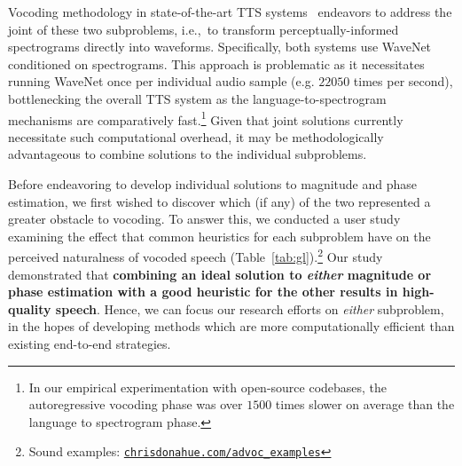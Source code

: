\documentclass[a4paper]{article}
\newcommand{\coollink}[1]{\href{https://#1}{\nolinkurl{#1}}}
\begin{document}
Vocoding methodology in state-of-the-art TTS systems~\cite{ping2017deep,shen2018natural} endeavors to address the joint of these two subproblems, 
i.e.,~to transform perceptually-informed spectrograms directly into waveforms. 
Specifically, both systems use WaveNet~\cite{oord2016wavenet} conditioned on spectrograms. 
This approach is problematic as it necessitates running WaveNet once per individual audio sample (e.g. $22050$ times per second), bottlenecking the overall TTS system as the language-to-spectrogram mechanisms are comparatively fast.\footnote{In our empirical experimentation with open-source codebases, the autoregressive vocoding phase was over $1500$ times slower on average than the language to spectrogram phase.}
Given that joint solutions currently necessitate such computational overhead, 
it may be methodologically advantageous to combine solutions to the individual subproblems.

Before endeavoring to develop individual solutions to magnitude and phase estimation, 
we first wished to discover which (if any) of the two represented a greater obstacle to vocoding. 
To answer this, we conducted a user study examining the effect that common heuristics for each subproblem have on the perceived naturalness of vocoded speech (Table~\ref{tab:gl}).\footnote{Sound examples: \coollink{chrisdonahue.com/advoc_examples}} 
Our study demonstrated that \textbf{combining an ideal solution to \emph{either} magnitude or phase estimation with a good heuristic for the other results in high-quality speech}. 
Hence, 
we can focus our research efforts on \emph{either} subproblem, 
in the hopes of developing methods which are more computationally efficient than existing end-to-end strategies.


\end{document}
